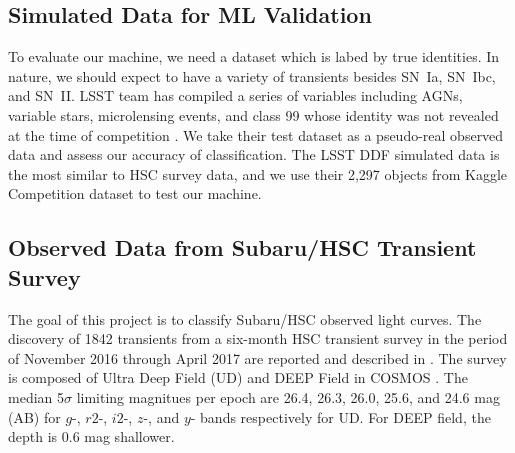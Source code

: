 \documentclass[useamsfonts]{pasj01}
\begin{document}
\subsection{Simulated Data for ML Validation}
\label{sec:validation}
To evaluate our machine, we need a dataset which is labed by true identities.   In nature, we should 
expect to have a variety of transients besides SN~Ia, SN~Ibc, and SN~II.
LSST team has compiled a series of variables including AGNs, variable stars, microlensing events,
and class 99 whose identity was not revealed at the time of competition \citep{malz19a,kessler19a}.   
We take their test dataset as a pseudo-real observed data and assess our accuracy of classification.
The LSST DDF simulated data is the most similar to HSC survey data, and we use their 2,297 objects 
from Kaggle Competition \citep{malz19a} dataset to test our machine.

\subsection{Observed Data from Subaru/HSC Transient Survey}
\label{sec:hscdata}
The goal of this project is to classify Subaru/HSC observed light curves. 
The discovery of 1842 transients from a six-month HSC transient survey in the period of
November 2016 through April 2017 are reported and described in \citet{yasuda19a}.
The survey is composed of Ultra Deep Field (UD) and DEEP Field in COSMOS \citep{scoville07a}.
The median 5$\sigma$ limiting magnitues per epoch are 26.4, 26.3, 26.0, 25.6, and 24.6 mag (AB)
for $g$-, $r2$-, $i2$-, $z$-, and $y$- bands respectively for UD. 
For DEEP field, the depth is 0.6 mag shallower.

%
%
%
\end{document}
